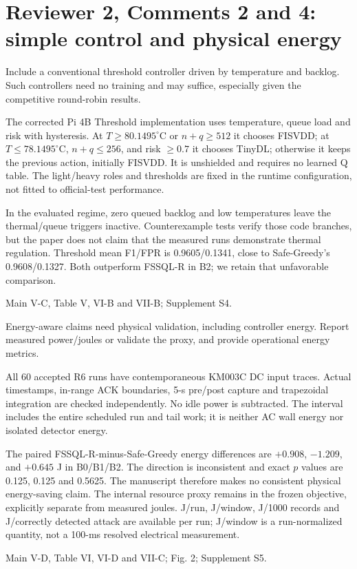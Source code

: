\documentclass[10pt,a4paper]{article}
\newcommand{\commentbox}[1]{\begin{rcommentbox}#1\end{rcommentbox}}
\newcommand{\responsebox}[1]{\begin{authorresponsebox}#1\end{authorresponsebox}}
\newcommand{\changebox}[1]{\begin{wherebox}#1\end{wherebox}}
\begin{document}
\clearpage
\section*{Reviewer 2, Comments 2 and 4: simple control and physical energy}
\commentbox{Include a conventional threshold controller driven by temperature and backlog. Such controllers need no training and may suffice, especially given the competitive round-robin results.}
\responsebox{The corrected Pi 4B Threshold implementation uses temperature, queue load and risk with hysteresis. At $T\ge80.1495^\circ$C or $n+q\ge512$ it chooses FISVDD; at $T\le78.1495^\circ$C, $n+q\le256$, and risk $\ge0.7$ it chooses TinyDL; otherwise it keeps the previous action, initially FISVDD. It is unshielded and requires no learned Q table. The light/heavy roles and thresholds are fixed in the runtime configuration, not fitted to official-test performance.

In the evaluated regime, zero queued backlog and low temperatures leave the thermal/queue triggers inactive. Counterexample tests verify those code branches, but the paper does not claim that the measured runs demonstrate thermal regulation. Threshold mean F1/FPR is 0.9605/0.1341, close to Safe-Greedy's 0.9608/0.1327. Both outperform FSSQL-R in B2; we retain that unfavorable comparison.}
\changebox{Main V-C, Table V, VI-B and VII-B; Supplement S4.}
\commentbox{Energy-aware claims need physical validation, including controller energy. Report measured power/joules or validate the proxy, and provide operational energy metrics.}
\responsebox{All 60 accepted R6 runs have contemporaneous KM003C DC input traces. Actual timestamps, in-range ACK boundaries, 5-s pre/post capture and trapezoidal integration are checked independently. No idle power is subtracted. The interval includes the entire scheduled run and tail work; it is neither AC wall energy nor isolated detector energy.

The paired FSSQL-R-minus-Safe-Greedy energy differences are $+0.908$, $-1.209$, and $+0.645$ J in B0/B1/B2. The direction is inconsistent and exact $p$ values are 0.125, 0.125 and 0.5625. The manuscript therefore makes no consistent physical energy-saving claim. The internal resource proxy remains in the frozen objective, explicitly separate from measured joules. J/run, J/window, J/1000 records and J/correctly detected attack are available per run; J/window is a run-normalized quantity, not a 100-ms resolved electrical measurement.}
\changebox{Main V-D, Table VI, VI-D and VII-C; Fig. 2; Supplement S5.}
\end{document}
